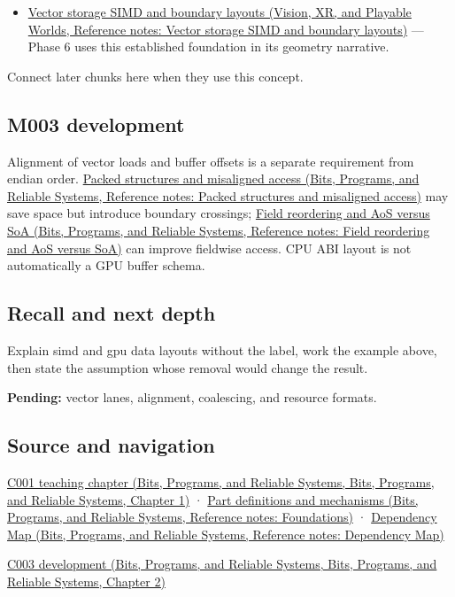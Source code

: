 \begin{itemize}
\tightlist
\item
  \href{../07-Vision-XR-and-Playable-Worlds/main.pdf\#nameddest=appendix-26bf6bf2fb8b}{Vector storage SIMD and boundary layouts (Vision, XR, and Playable Worlds, Reference notes: Vector storage SIMD and boundary layouts)} --- Phase 6 uses this established foundation in its geometry narrative.
\end{itemize}

Connect later chunks here when they use this concept.

\subsection{M003 development}\label{appendix-3c7b1a56de01-m003-development}

Alignment of vector loads and buffer offsets is a separate requirement from endian order. \href{../01-Bits-Programs-and-Reliable-Systems/main.pdf\#nameddest=appendix-0682dbfc5f0e}{Packed structures and misaligned access (Bits, Programs, and Reliable Systems, Reference notes: Packed structures and misaligned access)} may save space but introduce boundary crossings; \href{../01-Bits-Programs-and-Reliable-Systems/main.pdf\#nameddest=appendix-5522ad176ca0}{Field reordering and AoS versus SoA (Bits, Programs, and Reliable Systems, Reference notes: Field reordering and AoS versus SoA)} can improve fieldwise access. CPU ABI layout is not automatically a GPU buffer schema.

\subsection{Recall and next depth}\label{appendix-3c7b1a56de01-recall-and-next-depth}

Explain simd and gpu data layouts without the label, work the example above, then state the assumption whose removal would change the result.

\textbf{Pending:} vector lanes, alignment, coalescing, and resource formats.

\subsection{Source and navigation}\label{appendix-3c7b1a56de01-source-and-navigation}

\href{../01-Bits-Programs-and-Reliable-Systems/main.pdf\#nameddest=01-foundations-i-ch001-from-a-signal-to-an-interpretation}{C001 teaching chapter (Bits, Programs, and Reliable Systems, Bits, Programs, and Reliable Systems, Chapter 1)} · \href{../01-Bits-Programs-and-Reliable-Systems/main.pdf\#nameddest=appendix-fd090d982a15}{Part definitions and mechanisms (Bits, Programs, and Reliable Systems, Reference notes: Foundations)} · \href{../01-Bits-Programs-and-Reliable-Systems/main.pdf\#nameddest=appendix-4ad47bdd269a}{Dependency Map (Bits, Programs, and Reliable Systems, Reference notes: Dependency Map)}

\href{../01-Bits-Programs-and-Reliable-Systems/main.pdf\#nameddest=01-foundations-i-ch002-where-the-bytes-live}{C003 development (Bits, Programs, and Reliable Systems, Bits, Programs, and Reliable Systems, Chapter 2)}
